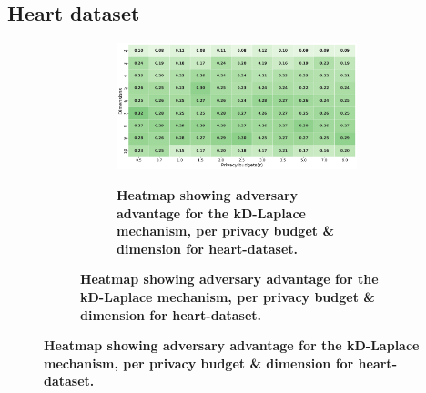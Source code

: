 \subsection{Heart dataset}
\begin{figure}[H]
      \centering
      \begin{subfigure}[b]{0.85\textwidth}
            \begin{subfigure}[c]{1\textwidth}
                  \caption{\textbf{Heatmap showing adversary advantage for the kD-Laplace mechanism, per privacy budget \& dimension for heart-dataset.}}
                  \includegraphics[width=1\textwidth]{Results/kd-laplace/kd-Laplace/heart-dataset/shokri_mi_adv.png}
                  \label{fig:privacy_heart-dataset_adversial_advantage_kd-laplace}
            \end{subfigure}
            \vfill %


\end{subfigure}
\end{figure}
